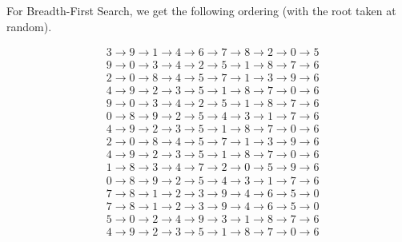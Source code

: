 \documentclass[12pt]{scrartcl}
\begin{document}
\subproblem{}
For Breadth-First Search, we get the following ordering (with the root taken at random).

\begin{align*}
    & 3\rightarrow 9\rightarrow 1\rightarrow 4\rightarrow 6\rightarrow 7\rightarrow 8\rightarrow 2\rightarrow 0\rightarrow 5 \\
    & 9\rightarrow 0\rightarrow 3\rightarrow 4\rightarrow 2\rightarrow 5\rightarrow 1\rightarrow 8\rightarrow 7\rightarrow 6 \\
    & 2\rightarrow 0\rightarrow 8\rightarrow 4\rightarrow 5\rightarrow 7\rightarrow 1\rightarrow 3\rightarrow 9\rightarrow 6 \\
    & 4\rightarrow 9\rightarrow 2\rightarrow 3\rightarrow 5\rightarrow 1\rightarrow 8\rightarrow 7\rightarrow 0\rightarrow 6 \\
    & 9\rightarrow 0\rightarrow 3\rightarrow 4\rightarrow 2\rightarrow 5\rightarrow 1\rightarrow 8\rightarrow 7\rightarrow 6 \\
    & 0\rightarrow 8\rightarrow 9\rightarrow 2\rightarrow 5\rightarrow 4\rightarrow 3\rightarrow 1\rightarrow 7\rightarrow 6 \\
    & 4\rightarrow 9\rightarrow 2\rightarrow 3\rightarrow 5\rightarrow 1\rightarrow 8\rightarrow 7\rightarrow 0\rightarrow 6 \\
    & 2\rightarrow 0\rightarrow 8\rightarrow 4\rightarrow 5\rightarrow 7\rightarrow 1\rightarrow 3\rightarrow 9\rightarrow 6 \\
    & 4\rightarrow 9\rightarrow 2\rightarrow 3\rightarrow 5\rightarrow 1\rightarrow 8\rightarrow 7\rightarrow 0\rightarrow 6 \\
    & 1\rightarrow 8\rightarrow 3\rightarrow 4\rightarrow 7\rightarrow 2\rightarrow 0\rightarrow 5\rightarrow 9\rightarrow 6 \\
    & 0\rightarrow 8\rightarrow 9\rightarrow 2\rightarrow 5\rightarrow 4\rightarrow 3\rightarrow 1\rightarrow 7\rightarrow 6 \\
    & 7\rightarrow 8\rightarrow 1\rightarrow 2\rightarrow 3\rightarrow 9\rightarrow 4\rightarrow 6\rightarrow 5\rightarrow 0 \\
    & 7\rightarrow 8\rightarrow 1\rightarrow 2\rightarrow 3\rightarrow 9\rightarrow 4\rightarrow 6\rightarrow 5\rightarrow 0 \\
    & 5\rightarrow 0\rightarrow 2\rightarrow 4\rightarrow 9\rightarrow 3\rightarrow 1\rightarrow 8\rightarrow 7\rightarrow 6 \\
    & 4\rightarrow 9\rightarrow 2\rightarrow 3\rightarrow 5\rightarrow 1\rightarrow 8\rightarrow 7\rightarrow 0\rightarrow 6 \\
\end{align*}
\end{document}
